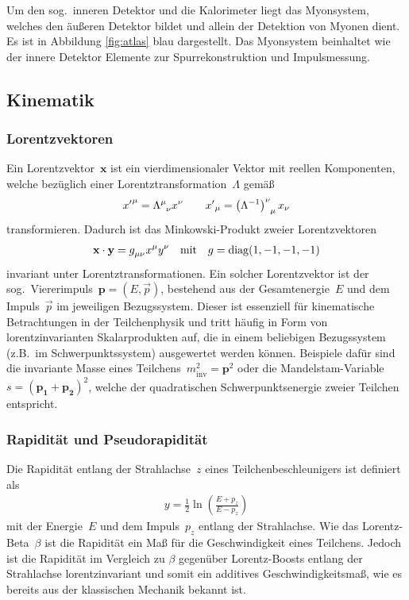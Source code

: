 \documentclass[11pt, a4paper]{article}
\numberwithin{equation}{section}
\begin{document}
Um den sog.\ inneren Detektor und die Kalorimeter liegt das Myonsystem, welches den äußeren Detektor bildet und allein der Detektion von Myonen dient.
Es ist in Abbildung \ref{fig:atlas} blau dargestellt.
Das Myonsystem beinhaltet wie der innere Detektor Elemente zur Spurrekonstruktion und Impulsmessung.


\subsection{Kinematik}

\subsubsection{Lorentzvektoren}
Ein Lorentzvektor~$\mathbf{x}$ ist ein vierdimensionaler Vektor mit reellen Komponenten, welche bezüglich einer Lorentztransformation~$\Lambda$ gemäß
\begin{align*}
	{x^\prime}^\mu = \tensor{\Lambda}{^\mu_\nu} x^\nu \qquad {x^\prime}_\mu = \tensor{\left(\Lambda^{-1}\right)}{^\nu_\mu} x_\nu
\end{align*}
transformieren.
Dadurch ist das Minkowski-Produkt zweier Lorentzvektoren
\begin{align*}
	\mathbf{x} \cdot \mathbf{y} = \tensor{g}{_\mu_\nu} x^\mu y^\nu \quad \text{mit} \quad g = \mathrm{diag}(1,-1,-1,-1)
\end{align*}
invariant unter Lorentztransformationen.
Ein solcher Lorentzvektor ist der sog.\ Viererimpuls~$\mathbf{p} = \left(E, \vec{p}\right)$, bestehend aus der Gesamtenergie~$E$ und dem Impuls~$\vec{p}$ im jeweiligen Bezugssystem.
Dieser ist essenziell für kinematische Betrachtungen in der Teilchenphysik und tritt häufig in Form von lorentzinvarianten Skalarprodukten auf, die in einem beliebigen Bezugssystem (z.B.\ im Schwerpunktssystem) ausgewertet werden können.
Beispiele dafür sind die invariante Masse eines Teilchens~$m_\mathrm{inv}^2 = \mathbf{p}^2$ oder die Mandelstam-Variable~$s = (\mathbf{p_1} + \mathbf{p_2})^2$, welche der quadratischen Schwerpunktsenergie zweier Teilchen entspricht.

\subsubsection{Rapidität und Pseudorapidität}
Die Rapidität entlang der Strahlachse~$z$ eines Teilchenbeschleunigers ist definiert als \cite{script}
\begin{align*}
	y = \frac{1}{2}\ln\left( \frac{E+p_z}{E-p_z} \right)
\end{align*}
mit der Energie~$E$ und dem Impuls~$p_z$ entlang der Strahlachse.
Wie das Lorentz-Beta~$\beta$ ist die Rapidität ein Maß für die Geschwindigkeit eines Teilchens.
Jedoch ist die Rapidität im Vergleich zu $\beta$ gegenüber Lorentz-Boosts entlang der Strahlachse lorentzinvariant und somit ein additives Geschwindigkeitsmaß, wie es bereits aus der klassischen Mechanik bekannt ist.
\end{document}
